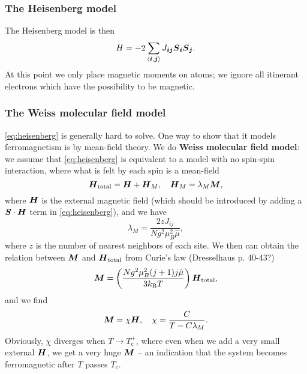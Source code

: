 \documentclass[hyperref, a4paper]{article}
\newcommand*{\pair}[1]{\langle #1 \rangle}
\newcommand*{\concept}[1]{{\textbf{#1}}}
\begin{document}
\subsubsection{The Heisenberg model}

The Heisenberg model is then 
\begin{equation}
    H = - 2 \sum_{\pair{\vb*{i}, \vb*{j}}} J_{\vb*{i} \vb*{j}} \vb*{S}_{\vb*{i}} \vb*{S}_{\vb*{j}}.
    \label{eq:heisenberg}
\end{equation}
At this point we only place magnetic moments on atoms; 
we ignore all itinerant electrons which have the possibility to be magnetic.

\subsubsection{The Weiss molecular field model}

\eqref{eq:heisenberg} is generally hard to solve.
One way to show that it models ferromagnetism is by mean-field theory.
We do \concept{Weiss molecular field model}:
we assume that \eqref{eq:heisenberg} is equivalent to a model with no spin-spin interaction,
where what is felt by each spin is a mean-field 
\begin{equation}
    \vb*{H}_{\text{total}} = \vb*{H} + \vb*{H}_M, \quad 
    \vb*{H}_M = \lambda_M \vb*{M},
\end{equation}
where $\vb*{H}$ is the external magnetic field 
(which should be introduced by adding a $\vb*{S} \cdot \vb*{H}$ term in \eqref{eq:heisenberg}),
and we have 
\begin{equation}
    \lambda_M = \frac{2 z J_{ij}}{N g^2 \mu_B^2 \hat{\mu}},
\end{equation}
where $z$ is the number of nearest neighbors of each site.
We then can obtain the relation between $\vb*{M}$ and $\vb*{H}_{\text{total}}$
from Curie's law (Dresselhaus p. 40-43?)
\begin{equation}
    \vb*{M} = \left(
        \frac{N g^2 \mu_B^2 (j+1) j \hat{\mu}}{3 k_{\text{B}} T} 
    \right) \vb*{H}_{\text{total}},
\end{equation}
and we find 
\begin{equation}
    \vb*{M} = \chi \vb*{H}, \quad 
    \chi = \frac{C}{T - C \lambda_M}.
\end{equation}
Obviously, $\chi$ diverges when $T \to T_{\text{c}}^+$,
where even when we add a very small external $\vb*{H}$,
we get a very huge $\vb*{M}$ -- 
an indication that the system becomes ferromagnetic after $T$ passes $T_{\text{c}}$.
\end{document}
